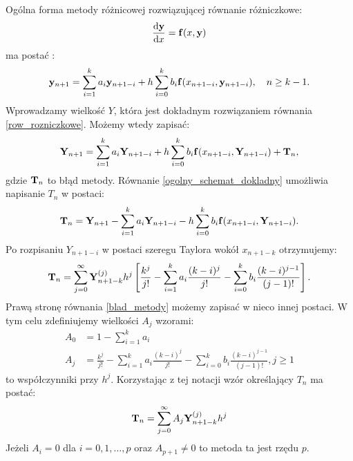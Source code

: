 \documentclass[10pt, a4paper, twoside, onecolumn]{article}
\numberwithin{equation}{section}
\begin{document}
	Ogólna forma metody różnicowej rozwiązującej równanie różniczkowe:
	\begin{equation}\label{row_rozniczkowe}
		\dv{\vb{y}}{x}=\vb{f}(x, \vb{y})
	\end{equation}
	ma postać \cite{fortuna}:
	\begin{equation}\label{metoda_roznicowa}
		\vb{y}_{n+1} = \sum_{i=1}^{k}a_{i}\vb{y}_{n+1-i} + h\sum_{i=0}^{k}b_{i}\vb{f}(x_{n+1-i}, \vb{y}_{n+1-i}), \quad n\geq k-1.
	\end{equation}
	Wprowadzamy wielkość \(Y\), która jest dokładnym rozwiązaniem równania \eqref{row_rozniczkowe}. Możemy wtedy zapisać: 
	\begin{equation}\label{ogolny_schemat_dokladny}
		\vb{Y}_{n+1} = \sum_{i=1}^{k}a_{i}\vb{Y}_{n+1-i} + h\sum_{i=0}^{k}b_{i}\vb{f}(x_{n+1-i}, \vb{Y}_{n+1-i}) + \vb{T}_{n},
	\end{equation}
	gdzie \(\vb{T}_{n}\) to błąd metody. Równanie \eqref{ogolny_schemat_dokladny} umożliwia napisanie \(T_{n}\) w postaci:
	\begin{equation}
		\vb{T}_{n} = \vb{Y}_{n+1} - \sum_{i=1}^{k}a_{i}\vb{Y}_{n+1-i} - h\sum_{i=0}^{k}b_{i}\vb{f}(x_{n+1-i}, \vb{Y}_{n+1-i}).
	\end{equation}
	Po rozpisaniu \(Y_{n+1-i}\) w postaci szeregu Taylora wokół \(x_{n+1-k}\) otrzymujemy:
	\begin{equation}\label{blad_metody}
		\vb{T}_{n} = \sum_{j=0}^{\infty}\vb{Y}_{n+1-k}^{(j)}h^{j}\left[\frac{k^{j}}{j!} - \sum_{i=1}^{k}a_{i}\frac{(k-i)^{j}}{j!} - \sum_{i=0}^{k}b_{i}\frac{(k-i)^{j-1}}{(j-1)!}\right].
	\end{equation}
	Prawą stronę równania \eqref{blad_metody} możemy zapisać w nieco innej postaci. W tym celu zdefiniujemy wielkości \(A_{j}\) wzorami:
	\begin{equation}
	\begin{split}
		A_{0} &= 1 - \sum_{i=1}^{k}a_{i} \\
		A_{j} &= \frac{k^{j}}{j!} - \sum_{i=1}^{k}a_{i}\frac{(k-i)^{j}}{j!} - \sum_{i=0}^{k}b_{i}\frac{(k-i)^{j-1}}{(j-1)!}, j\geq 1
	\end{split}
	\end{equation}
	to współczynniki przy \(h^{j}\). 
	Korzystając z tej notacji wzór określający \(T_{n}\) ma postać:
	\begin{equation}
		\vb{T}_{n} = \sum_{j=0}^{\infty}A_{j}\vb{Y}_{n+1-k}^{(j)}h^{j}
	\end{equation}
	Jeżeli \(A_{i}=0\) dla \(i=0, 1, \ldots, p\) oraz \(A_{p+1}\neq 0\) to metoda ta jest rzędu \(p\).
\end{document}
